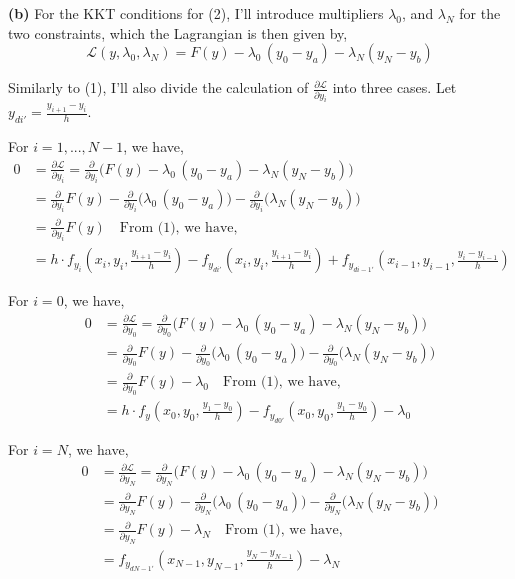 \documentclass[12pt]{article}
\begin{document}
\vspace{10pt}
\noindent
\textbf{(b)} For the KKT conditions for (2), I'll introduce multipliers $\lambda_0$, and $\lambda_N$ for the two constraints, which the Lagrangian is then given by, 
$$
\mathcal L(y,\lambda_0,\lambda_N) = F(y)-\lambda_0\,(y_0-y_a) - \lambda_N (y_N-y_b)
$$

Similarly to (1), I'll also divide the calculation of $\frac{\partial \mathcal{L}}{\partial y_i}$ into three cases. 
Let $y_{di'} = \frac{y_{i+1} - y_{i}}{h}$. 

For $i = 1, ..., N-1$, we have, 
\begin{align*}
	0 &= \frac{\partial \mathcal{L}}{\partial y_i} = \frac{\partial}{\partial y_i} \bigl(F(y)-\lambda_0\,(y_0-y_a) - \lambda_N (y_N-y_b) \bigr)\\
	&= \frac{\partial}{\partial y_i} F(y) - \frac{\partial}{\partial y_i} \bigl( \lambda_0\,(y_0-y_a) \bigr) - \frac{\partial}{\partial y_i} \bigl( \lambda_N (y_N-y_b) \bigr) \\
	&= \frac{\partial}{\partial y_i} F(y) \quad \text{From (1), we have,} \\
	&= h \cdot f_{y_i}(x_i, y_i, \frac{y_{i+1} - y_i}{h}) - f_{y_{di'}}(x_i, y_i, \frac{y_{i+1} - y_i}{h}) +  f_{y_{di-1'}}(x_{i-1}, y_{i-1}, \frac{y_i - y_{i-1}}{h})
\end{align*}

For $i = 0$, we have, 
\begin{align*}
	0 &= \frac{\partial \mathcal{L}}{\partial y_0} = \frac{\partial}{\partial y_0} \bigl(F(y)-\lambda_0\,(y_0-y_a) - \lambda_N (y_N-y_b) \bigr)\\
	&= \frac{\partial}{\partial y_0} F(y) - \frac{\partial}{\partial y_0} \bigl( \lambda_0\,(y_0-y_a) \bigr) - \frac{\partial}{\partial y_0} \bigl( \lambda_N (y_N-y_b) \bigr) \\
	&= \frac{\partial}{\partial y_0} F(y) - \lambda_0 \quad \text{From (1), we have,} \\
	&= h \cdot f_y(x_0, y_0, \frac{y_1 - y_0}{h}) - f_{y_{d0'}}(x_0, y_0, \frac{y_1 - y_0}{h}) - \lambda_0
\end{align*}

For $i = N$, we have, 
\begin{align*}
	0 &= \frac{\partial \mathcal{L}}{\partial y_N} = \frac{\partial}{\partial y_N} \bigl(F(y)-\lambda_0\,(y_0-y_a) - \lambda_N (y_N-y_b) \bigr)\\
	&= \frac{\partial}{\partial y_N} F(y) - \frac{\partial}{\partial y_N} \bigl( \lambda_0\,(y_0-y_a) \bigr) - \frac{\partial}{\partial y_N} \bigl( \lambda_N (y_N-y_b) \bigr) \\
	&= \frac{\partial}{\partial y_N} F(y) - \lambda_N \quad \text{From (1), we have,} \\
	&= f_{y_{dN-1'}}(x_{N-1}, y_{N-1}, \frac{y_N - y_{N-1}}{h}) - \lambda_N
\end{align*}
\end{document}

